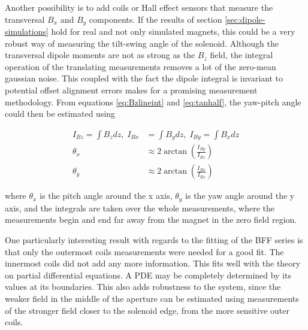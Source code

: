 Another possibility is to add coils or Hall effect sensors that measure
the transversal $B_x$ and $B_y$ components. If the results of section 
\ref{sec:dipole-simulations} hold for real and not only simulated magnets,
this could be a very robust way of measuring the tilt-swing angle of the
solenoid. Although the transversal dipole moments are not as strong as
the $B_z$ field, the integral operation of the translating measurements
removes a lot of the zero-mean gaussian noise. This coupled with the fact the dipole
integral is invariant to potential offset alignment errors makes for
a promising measurement methodology. From equations 
\ref{eq:Bzlineint} and \ref{eq:tanhalf}, the 
yaw-pitch angle could then be estimated using

\begin{align}
    I_{Bz} = \int B_z dz, \; 
    I_{Bx} &= \int B_y dz, \; 
    I_{By} = \int B_x dz \\
    \theta_x &\approx 2\arctan(\frac{I_{By}}{I_{Bz}})\\
    \theta_y &\approx 2\arctan(\frac{I_{Bx}}{I_{Bz}})
\end{align}

where $\theta_x$ is the pitch angle around the x axis,
$\theta_y$ is the yaw angle around the y axis, and the 
integrals are taken over the whole measurements, where
the measurements begin and end far away from the magnet
in the zero field region.

One particularly interesting result with regards to the fitting
of the BFF series is that only the outermost coils measurements
were needed for a good fit. The innermost coils did not add any
more information. This fits well with the theory on partial
differential equations. A PDE may be completely determined
by its values at its boundaries. This also adds robustness to the system,
since the weaker field in the middle of the aperture can be estimated
using measurements of the stronger field closer to the solenoid edge,
from the more sensitive outer coils.